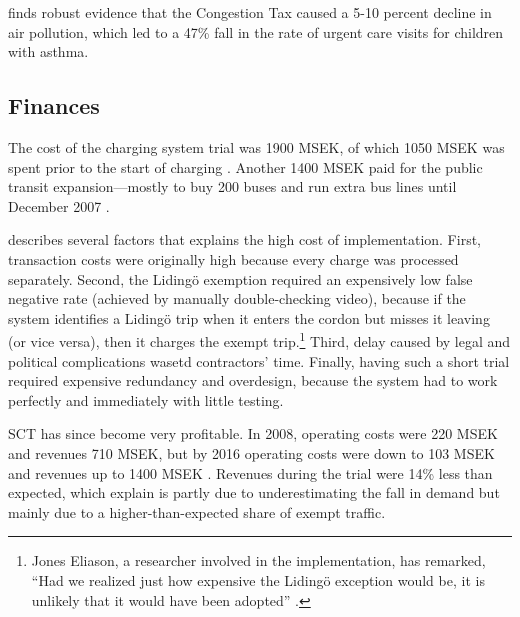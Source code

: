 \citet{Simeonova2017} finds robust evidence that the Congestion Tax caused a 5-10 percent decline in air pollution, which led to a 47\% fall in the rate of urgent care visits for children with asthma.

\subsection{Finances}

The cost of the charging system trial was 1900 MSEK, of which 1050 MSEK was spent prior to the start of charging \citep{Eliasson2009}. Another 1400 MSEK paid for the public transit expansion---mostly to buy 200 buses and run extra bus lines until December 2007 \citep[p. 398]{Eliasson2008}.

\citet{Hamilton2011} describes several factors that explains the high cost of implementation. First, transaction costs were originally high because every charge was processed separately. Second, the Liding\"o exemption required an expensively low false negative rate (achieved by manually double-checking video), because if the system identifies a Liding\"o trip when it enters the cordon but misses it leaving (or vice versa), then it charges the exempt trip.\footnote{Jones Eliason, a researcher involved in the implementation, has remarked, ``Had we realized just how expensive the Liding\"o exception would be, it is unlikely that it would have been adopted'' \citep[p. 217]{Eliasson2009b}.} Third, delay caused by legal and political complications wasetd contractors' time. Finally, having such a short trial required expensive redundancy and overdesign, because the system had to work perfectly and immediately with little testing.


 SCT has since become very profitable. In 2008, operating costs were 220 MSEK and revenues 710 MSEK, but by 2016 operating costs were down to 103 MSEK and revenues up to 1400 MSEK \citep[p. 40]{Borjesson2018}. Revenues during the trial were 14\% less than expected, which \citet{Eliasson2013} explain is partly due to underestimating the fall in demand but mainly due to a higher-than-expected share of exempt traffic.
